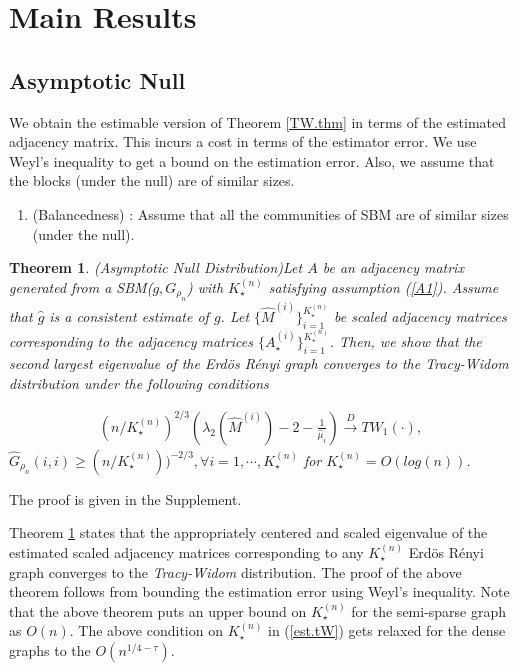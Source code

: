 \documentclass[11pt]{article}
\newtheorem{theorem}{Theorem}[section]
\newenvironment{proof}[1][Proof]{\begin{trivlist}
\item[\hskip \labelsep {\bfseries #1}]}{\end{trivlist}}
\newcommand{\be}{\begin{eqnarray}}
\newcommand{\ee}{\end{eqnarray}}
\begin{document}
\section{Main Results}\label{theory}
\subsection{Asymptotic Null} 
We obtain the estimable version of Theorem \ref{TW.thm} in terms of the estimated adjacency matrix. This incurs a cost in terms of the estimator error. We use Weyl's inequality to get a bound on the estimation error. Also, we assume that the blocks (under the null) are of similar sizes.

\begin{enumerate}[ label =A\arabic*]
\item\label{A1} (Balancedness) : Assume that all the communities of SBM are of similar sizes (under the null). 
\end{enumerate}

\begin{theorem} (Asymptotic Null Distribution)\label{est.TW.thm}
Let $A$ be an adjacency matrix generated from a SBM($g, G_{\rho_n}$) with $K_{\star}^{(n)}$ satisfying assumption (\ref{A1}). Assume that $\hat{g}$ is a consistent estimate of $g$. Let $\{ \hat{M}^{(i)}\}_{i=1}^{K_{\star}^{(n)}}$ be scaled adjacency matrices corresponding to the adjacency matrices $\{ A_{\star}^{(i)} \}_{i=1}^{K_{\star}^{(n)}}$. Then, we show that the second largest eigenvalue of the Erd\"{o}s R\'{e}nyi graph converges to the Tracy-Widom distribution under the following conditions

\be\label{est.tW}
(n/K_{\star}^{(n)})^{2/3}(\lambda_2(\hat{M}^{(i)}) - 2 - \frac{1}{\hat{\mu}_i}) \xrightarrow[]{D} TW_1(\cdot),
\ee
{} $\hat{G}_{\rho_n}(i,i) \ge (n/K_{\star}^{(n)}))^{-2/3},  \forall i =1, \cdots, K_{\star}^{(n)}$
for $K_{\star}^{(n)} = O(log(n))$.
\end{theorem}

\begin{proof}
The proof is given in the Supplement.
\end{proof}

Theorem \ref{est.TW.thm} states that the appropriately centered and scaled eigenvalue of the estimated scaled adjacency matrices corresponding to any $K_{\star}^{(n)}$ Erd\"{o}s R\'{e}nyi graph converges to the \emph{Tracy-Widom} distribution. The proof of the above theorem follows from bounding the estimation error using Weyl's inequality. Note that the above theorem puts an upper bound on $K_{\star}^{(n)}$ for the semi-sparse graph as $O(n)$. The above condition on $K_{\star}^{(n)}$ in (\ref{est.tW}) gets relaxed for the dense graphs to the $O(n^{1/4 - \tau})$.
\end{document}
